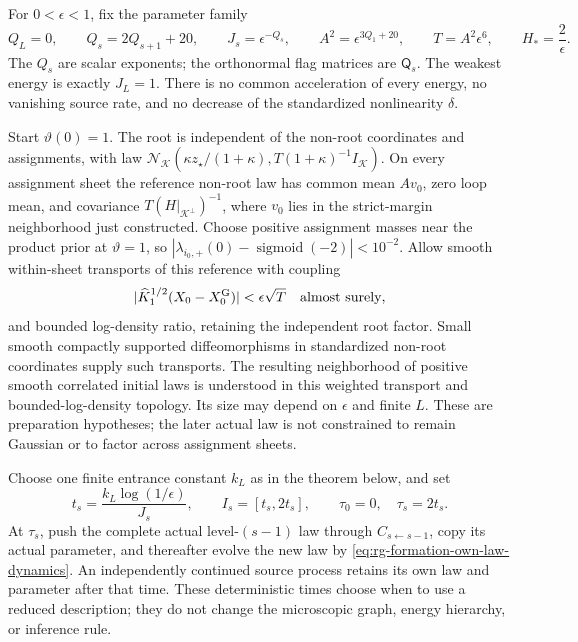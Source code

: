 For \(0<\epsilon<1\), fix the parameter family
\begin{equation}
Q_L=0,\qquad Q_s=2Q_{s+1}+20,\qquad
J_s=\epsilon^{-Q_s},\qquad
A^2=\epsilon^{3Q_1+20},\qquad
T=A^2\epsilon^6,\qquad H_*=\frac2\epsilon.
\label{eq:rg-formation-weakest-one-regime}
\end{equation}
The \(Q_s\) are scalar exponents; the orthonormal flag matrices are
\(\mathsf Q_s\). The weakest energy is exactly \(J_L=1\). There is no
common acceleration of every energy, no vanishing source rate, and no
decrease of the standardized nonlinearity \(\delta\).

Start \(\vartheta(0)=1\). The root is independent of the non-root
coordinates and assignments, with law
\(\mathcal N_{\mathcal K}(\kappa z_\star/(1+\kappa),
T(1+\kappa)^{-1}I_{\mathcal K})\). On every assignment sheet the
reference non-root law has common mean \(Av_0\), zero loop mean, and
covariance \(T(H|_{\mathcal K^\perp})^{-1}\), where \(v_0\) lies in
the strict-margin neighborhood just constructed. Choose positive
assignment masses near the product prior at \(\vartheta=1\), so
\(|\lambda_{i_0,+}(0)-\operatorname{sigmoid}(-2)|<10^{-2}\).
Allow smooth within-sheet transports of this reference with coupling
\begin{equation}
|\widehat K_1^{1/2}(X_0-X_0^{\mathrm G})|
 <\epsilon\sqrt T
\quad\hbox{almost surely},
\label{eq:rg-formation-preparation-transport}
\end{equation}
and bounded log-density ratio, retaining the independent root factor.
Small smooth compactly supported diffeomorphisms in standardized
non-root coordinates supply such transports. The resulting neighborhood
of positive smooth correlated initial laws is understood in this weighted
transport and bounded-log-density topology. Its size may depend on
\(\epsilon\) and finite \(L\). These are preparation hypotheses;
the later actual law is not constrained to remain Gaussian or to
factor across assignment sheets. 

Choose one finite entrance constant \(k_L\) as in the theorem below,
and set
\begin{equation}
t_s=\frac{k_L\log(1/\epsilon)}{J_s},
\qquad I_s=[t_s,2t_s],\qquad
\tau_0=0,\quad\tau_s=2t_s.
\label{eq:rg-formation-activation-times}
\end{equation}
At \(\tau_s\), push the complete actual level-\((s-1)\) law through
\(C_{s\leftarrow s-1}\), copy its actual parameter, and thereafter
evolve the new law by
\cref{eq:rg-formation-own-law-dynamics}. An independently continued
source process retains its own law and parameter after that time.
These deterministic times choose when to use a reduced description;
they do not change the microscopic graph, energy hierarchy, or
inference rule. 

